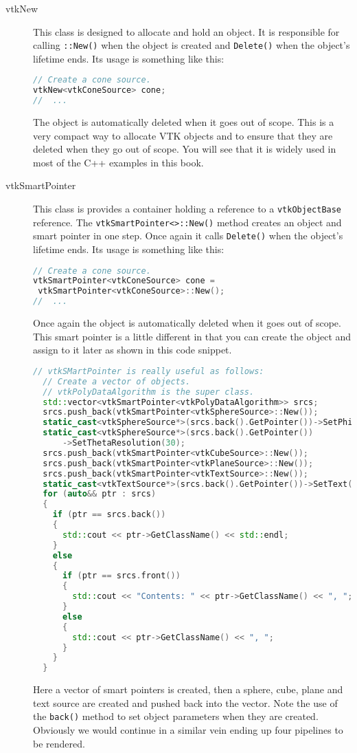 \begin{description}%

\item[vtkNew] This class is designed to allocate and hold an object. It is responsible for calling \texttt{::New()} when the object is created and \texttt{Delete()} when the object's lifetime ends. Its usage is something like this:
\begin{lstlisting}[language=C++]
// Create a cone source.
vtkNew<vtkConeSource> cone;
//  ...
\end{lstlisting}
The object is automatically deleted when it goes out of scope. This is a very compact way to allocate VTK objects and to ensure that they are deleted when they go out of scope. You will see that it is widely used in most of the C++ examples in this book.

\item[vtkSmartPointer] This class is provides a container holding a reference to a \texttt{vtkObjectBase} reference. The \texttt{vtkSmartPointer<>::New()} method creates an object and smart pointer in one step. Once again it calls \texttt{Delete()} when the object's lifetime ends. Its usage is something like this:
\begin{lstlisting}[language=C++]
// Create a cone source.
vtkSmartPointer<vtkConeSource> cone =
 vtkSmartPointer<vtkConeSource>::New();
//  ...
\end{lstlisting}

Once again the object is automatically deleted when it goes out of scope. This smart pointer is a little different in that you can create the object and assign to it later as shown in this code snippet.

\begin{lstlisting}[language=C++]
  // vtkSMartPointer is really useful as follows:
  // Create a vector of objects.
  // vtkPolyDataAlgorithm is the super class.
  std::vector<vtkSmartPointer<vtkPolyDataAlgorithm>> srcs;
  srcs.push_back(vtkSmartPointer<vtkSphereSource>::New());
  static_cast<vtkSphereSource*>(srcs.back().GetPointer())->SetPhiResolution(30);
  static_cast<vtkSphereSource*>(srcs.back().GetPointer())
      ->SetThetaResolution(30);
  srcs.push_back(vtkSmartPointer<vtkCubeSource>::New());
  srcs.push_back(vtkSmartPointer<vtkPlaneSource>::New());
  srcs.push_back(vtkSmartPointer<vtkTextSource>::New());
  static_cast<vtkTextSource*>(srcs.back().GetPointer())->SetText("Hello");
  for (auto&& ptr : srcs)
  {
    if (ptr == srcs.back())
    {
      std::cout << ptr->GetClassName() << std::endl;
    }
    else
    {
      if (ptr == srcs.front())
      {
        std::cout << "Contents: " << ptr->GetClassName() << ", ";
      }
      else
      {
        std::cout << ptr->GetClassName() << ", ";
      }
    }
  }
\end{lstlisting}
Here a vector of smart pointers is created, then a sphere, cube, plane and text source are created and pushed back into the vector. Note the use of the \texttt{back()} method to set object parameters when they are created. Obviously we would continue in a similar vein ending up four pipelines to be rendered.


\end{description}
